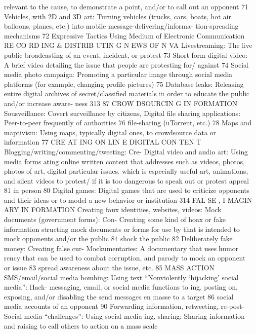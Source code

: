 \documentclass[twoside,a4paper,12pt,fleqn,openany]{extbook}
\begin{document}
relevant to the cause, to demonstrate a point,
and/or to call out an opponent
 71
Vehicles, with 2D and 3D art: Turning vehicles
(trucks, cars, boats, hot air balloons, planes,
etc.) into mobile message-delivering/informa-
tion-spreading mechanisms
 72
Expressive Tactics Using Medium of Electronic Communication
RE CO RD ING & DISTRIB UTIN G N EWS OF N VA
Livestreaming: The live public broadcasting of
an event, incident, or protest
 73
Short form digital video: A brief video detailing
the issue that people are protesting for/
against
 74
Social media photo campaign: Promoting a
particular image through social media platforms
(for example, changing profile pictures)
 75
Database leaks: Releasing entire digital
archives of secret/classified materials in order
to educate the public and/or increase aware-
ness
 313
87
CROW DSOURCIN G IN FORMATION
Sousveillance: Covert surveillance by citizens,
 Digital file sharing applications: Peer-to-peer
frequently of authorities
 76
 file-sharing (uTorrent, etc.)
 78
Maps and maptivism: Using maps, typically digital
ones, to crowdsource data or information
 77
CRE AT ING ON LIN E DIGITAL CON TEN T
Blogging/writing/commenting/tweeting: Cre-
 Digital video and audio art: Using media forms
ating online written content that addresses
 such as videos, photos, photos of art, digital
particular issues, which is especially useful
 art, animations, and silent videos to protest/
if it is too dangerous to speak out or protest
 appeal
 81
in person
 80
Digital games: Digital games that are used to
criticize opponents and their ideas or to model
a new behavior or institution
 314
FAL SE , I MAGIN ARY IN FORMATION
Creating faux identities, websites, videos:
 Mock documents (government forms): Con-
Creating some kind of hoax or fake information
 structing mock documents or forms for use by
that is intended to mock opponents and/or
 the public
 84
shock the public
 82
Deliberately fake money: Creating false cur-
Mockumentaries: A documentary that uses humor
 rency that can be used to combat corruption,
and parody to mock an opponent or issue 83
 spread awareness about the issue, etc.
 85
MASS ACTION
SMS/email/social media bombing: Using text
 “Nonviolently ‘hijacking’ social media”: Hack-
messaging, email, or social media functions to
 ing, posting on, exposing, and/or disabling the
send messages en masse to a target
 86
 social media accounts of an opponent
 90
Forwarding information, retweeting, re-post-
 Social media “challenges”: Using social media
ing, sharing: Sharing information and raising
 to call others to action on a mass scale
\end{document}
